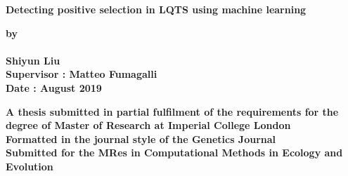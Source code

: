 \thispagestyle{empty}
\null\vskip0.2in%
\begin{center}
\huge{{\bf 
Detecting positive selection in LQTS using machine learning}}
\end{center}

\vspace{1.5cm}

\begin{center}
{\Large {\bf by}}\\
\mbox{} \\
{\Large {\bf Shiyun Liu }}\\

\vspace{0.5cm}
{\large {\bf Supervisor : Matteo Fumagalli}}\\
{\large {\bf Date : August 2019}}

\end{center}

\vspace{1cm}




\vspace{1.5cm}


\vspace{2.5cm}

\begin{center}
\normalsize{\bf{A thesis submitted in partial fulfilment of the requirements for the degree of Master of Research at Imperial College London \\
Formatted in the journal style of the Genetics Journal \\
Submitted for the MRes in Computational Methods in Ecology and Evolution}}
\end{center}

\vspace{2cm}